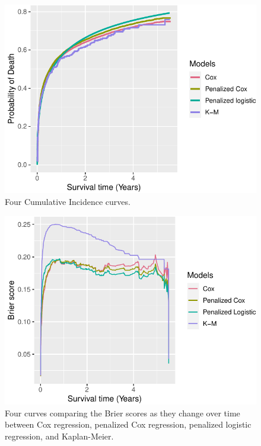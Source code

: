 \documentclass[
]{jss}
\begin{document}
\begin{CodeChunk}
\begin{figure}

{\centering \includegraphics{../figures/cs3Final-1} 

}

\caption{\label{fig:cs3Final} Four Cumulative Incidence curves.}\label{fig:cs3Final}
\end{figure}
\end{CodeChunk}

\begin{CodeChunk}
\begin{figure}

{\centering \includegraphics{../figures/riskregressionBrier-1} 

}

\caption{\label{fig:cs3FinalBrier} Four curves comparing the Brier scores as they change over time between Cox regression, penalized Cox regression, penalized logistic regression, and Kaplan-Meier.}\label{fig:riskregressionBrier}
\end{figure}
\end{CodeChunk}
\end{document}
